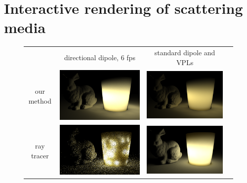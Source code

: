 \section{Interactive rendering of scattering media}
\begin{figure}[t]
\centering
\begin{tabular}{@{}c@{$\,$}c@{}c@{}c@{}}
& directional dipole, 6 fps & standard dipole and VPLs \\
\begin{sideways}\hspace*{1.5em}our method\end{sideways} &
\includegraphics[width=0.43\columnwidth]{figures/candle_holder_directional_6fps.png} &
\includegraphics[width=0.43\columnwidth]{figures/candle_holder_jensen_converged.png} \\[-4pt]
\begin{sideways}\hspace*{1.7em}ray tracer\end{sideways} &
\includegraphics[width=0.43\columnwidth]{figures/scene_comparison_optix_6fps.png} &
\includegraphics[width=0.43\columnwidth]{figures/scene_comparison_converged.png} \\[-0.5ex]

\end{tabular}
\end{figure}
